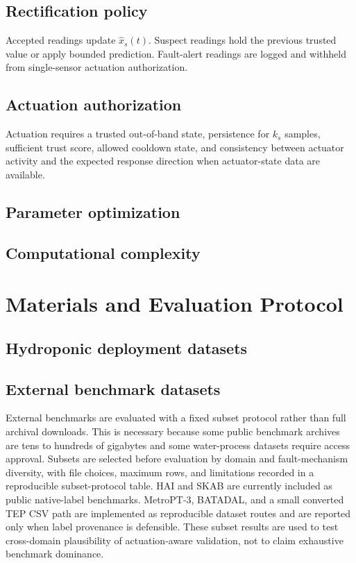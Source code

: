 \documentclass[preprint,12pt]{elsarticle}
\begin{document}
\subsection{Rectification policy}
Accepted readings update $\hat{x}_s(t)$. Suspect readings hold the previous trusted value or apply bounded prediction. Fault-alert readings are logged and withheld from single-sensor actuation authorization.

\subsection{Actuation authorization}
Actuation requires a trusted out-of-band state, persistence for $k_s$ samples, sufficient trust score, allowed cooldown state, and consistency between actuator activity and the expected response direction when actuator-state data are available.
\subsection{Parameter optimization}
\subsection{Computational complexity}

\section{Materials and Evaluation Protocol}
\subsection{Hydroponic deployment datasets}
\subsection{External benchmark datasets}
External benchmarks are evaluated with a fixed subset protocol rather than full archival downloads. This is necessary because some public benchmark archives are tens to hundreds of gigabytes and some water-process datasets require access approval. Subsets are selected before evaluation by domain and fault-mechanism diversity, with file choices, maximum rows, and limitations recorded in a reproducible subset-protocol table. HAI and SKAB are currently included as public native-label benchmarks. MetroPT-3, BATADAL, and a small converted TEP CSV path are implemented as reproducible dataset routes and are reported only when label provenance is defensible. These subset results are used to test cross-domain plausibility of actuation-aware validation, not to claim exhaustive benchmark dominance.
\end{document}
